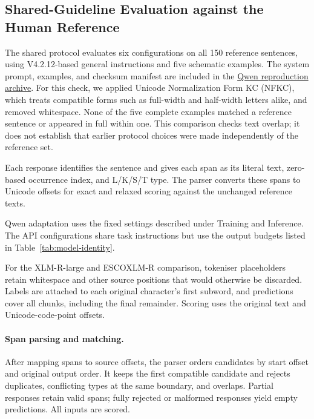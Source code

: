 \subsection{Shared-Guideline Evaluation against the Human Reference}
\label{sec:gold150-shared-r7}
The shared protocol evaluates six configurations on all 150 reference sentences, using V4.2.12-based general instructions and five schematic examples. The system prompt, examples, and checksum manifest are included in the \href{https://doi.org/10.5281/zenodo.22851581}{Qwen reproduction archive}. For this check, we applied Unicode Normalization Form KC (NFKC), which treats compatible forms such as full-width and half-width letters alike, and removed whitespace. None of the five complete examples matched a reference sentence or appeared in full within one. This comparison checks text overlap; it does not establish that earlier protocol choices were made independently of the reference set.

Each response identifies the sentence and gives each span as its literal text, zero-based occurrence index, and L/K/S/T type. The parser converts these spans to Unicode offsets for exact and relaxed scoring against the unchanged reference texts.

Qwen adaptation uses the fixed settings described under Training and Inference. The API configurations share task instructions but use the output budgets listed in Table~\ref{tab:model-identity}.

For the XLM-R-large and ESCOXLM-R comparison, tokeniser placeholders retain whitespace and other source positions that would otherwise be discarded. Labels are attached to each original character's first subword, and predictions cover all chunks, including the final remainder. Scoring uses the original text and Unicode-code-point offsets.

\paragraph{Span parsing and matching.}
After mapping spans to source offsets, the parser orders candidates by start offset and original output order. It keeps the first compatible candidate and rejects duplicates, conflicting types at the same boundary, and overlaps. Partial responses retain valid spans; fully rejected or malformed responses yield empty predictions. All inputs are scored.

